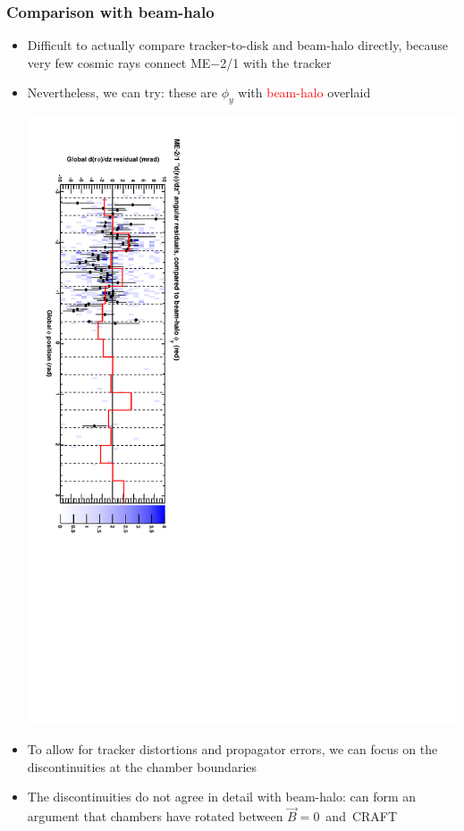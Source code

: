 \documentclass[compress]{beamer}
\begin{document}
\begin{frame}
\frametitle{Comparison with beam-halo}
\begin{itemize}\setlength{\itemsep}{0.25 cm}
\item Difficult to actually compare tracker-to-disk and beam-halo directly, because very few cosmic rays connect ME$-$2/1 with the tracker
\item Nevertheless, we can try: these are $\phi_y$ with \textcolor{red}{beam-halo} overlaid

\begin{center}
\includegraphics[height=\linewidth, angle=90]{datacsc_phiy_andbeamhalo.pdf}
\end{center}

\item To allow for tracker distortions and propagator errors, we can focus on the discontinuities at the chamber boundaries
\item The discontinuities do not agree in detail with beam-halo: can form an argument that chambers have rotated between \mbox{$\vec{B}=0$ and CRAFT\hspace{-1 cm}}
\end{itemize}
\end{frame}
\end{document}
